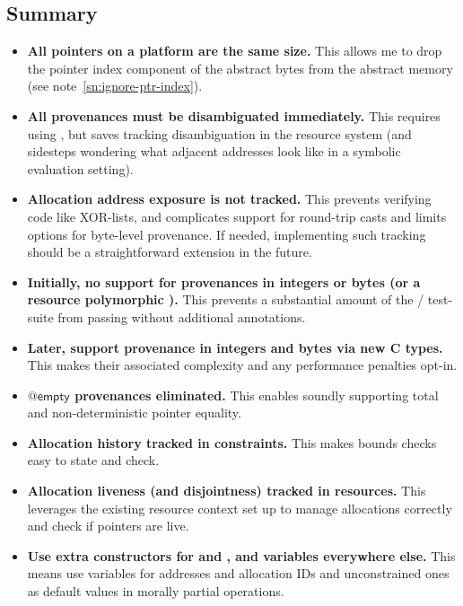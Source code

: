 \subsection{Summary}

\begin{itemize}
    \item \textbf{All pointers on a platform are the same size.} This
        allows me to drop the pointer index component of the abstract bytes
        from the abstract memory (see note~\ref{sn:ignore-ptr-index}).
    \item \textbf{All provenances must be disambiguated immediately.} This
        requires using , but saves tracking
        disambiguation in the resource system (and sidesteps wondering what
        adjacent addresses look like in a symbolic evaluation setting).
    \item \textbf{Allocation address exposure is not tracked.} This prevents
        verifying code like XOR-lists, and complicates support for round-trip
        casts and limits options for byte-level provenance. If needed,
        implementing such tracking should be a straightforward extension in the
        future.
    \item \textbf{Initially, no support for provenances in integers or bytes
        (or a resource polymorphic ).}
        This prevents a substantial amount of the /
        test-suite from passing without additional annotations.
    \item \textbf{Later, support provenance in integers and bytes via new C
        types.} This makes their associated complexity and any performance
        penalties opt-in.
    \item \textbf{$@\mathsf{empty}$ provenances eliminated.} This enables
        soundly supporting total and non-deterministic pointer equality.
    \item \textbf{Allocation history tracked in constraints.} This makes
        bounds checks easy to state and check.
    \item \textbf{Allocation liveness (and disjointness) tracked in
        resources.} This leverages the existing resource context set up
        to manage allocations correctly and check if pointers are live.
    \item \textbf{Use extra constructors for  and
        , and variables everywhere else.} This means use
        variables for addresses and allocation IDs and unconstrained ones as
        default values in morally partial operations.
\end{itemize}

